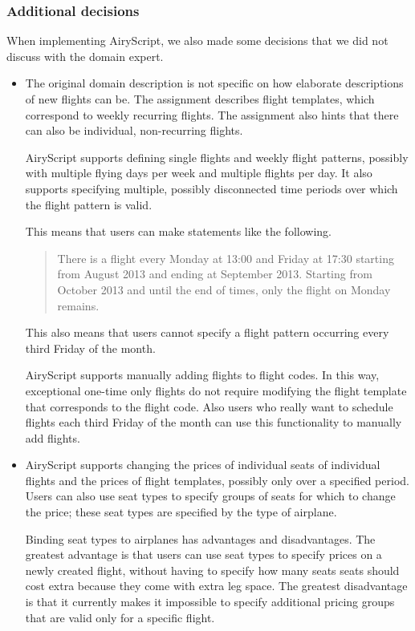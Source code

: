 \subsubsection{Additional decisions}
When implementing AiryScript, we also made some decisions that we did not
discuss with the domain expert.
\begin{itemize}

  \item The original domain description is not specific on how elaborate
    descriptions of new flights can be. The assignment describes flight
    templates, which correspond to weekly recurring flights. The assignment also
    hints that there can also be individual, non-recurring flights.
    
    AiryScript supports defining single flights and weekly flight patterns,
    possibly with multiple flying days per week and multiple flights per day. It
    also supports specifying multiple, possibly disconnected time periods over
    which the flight pattern is valid.
    
    This means that users can make statements like the following.
    \begin{quote}
      There is a flight every Monday at 13:00 and Friday at 17:30 starting from
      August 2013 and ending at September 2013. Starting from October 2013 and
      until the end of times, only the flight on Monday remains.
    \end{quote}
    This also means that users cannot specify a flight pattern occurring every
    third Friday of the month.
    
    AiryScript supports manually adding flights to flight codes. In this
    way, exceptional one-time only flights do not require modifying the flight
    template that corresponds to the flight code. Also users who really want to
    schedule flights each third Friday of the month can use this functionality
    to manually add flights.

  \item AiryScript supports changing the prices of individual seats of
    individual flights and the prices of flight templates, possibly only over a
    specified period. Users can also use seat types to specify groups of seats
    for which to change the price; these seat types are specified by the type of
    airplane.

    Binding seat types to airplanes has advantages and disadvantages. The
    greatest advantage is that users can use seat types to specify prices on a
    newly created flight, without having to specify how many seats seats should
    cost extra because they come with extra leg space. The greatest disadvantage
    is that it currently makes it impossible to specify additional pricing
    groups that are valid only for a specific flight.


\end{itemize}
